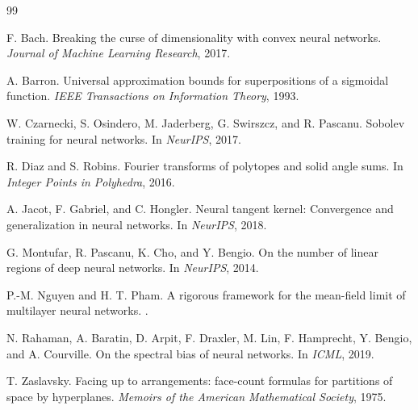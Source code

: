 \documentclass{article}
\begin{document}
\begin{thebibliography}{99}

F. Bach.
\newblock Breaking the curse of dimensionality with convex neural networks.
\newblock \emph{Journal of Machine Learning Research}, 2017.

A. Barron.
\newblock Universal approximation bounds for superpositions of a sigmoidal function.
\newblock \emph{IEEE Transactions on Information Theory}, 1993.

W. Czarnecki, S. Osindero, M. Jaderberg, G. Swirszcz, and R. Pascanu.
\newblock Sobolev training for neural networks.
\newblock In \emph{NeurIPS}, 2017.

R. Diaz and S. Robins.
\newblock Fourier transforms of polytopes and solid angle sums.
\newblock In \emph{Integer Points in Polyhedra}, 2016.

A. Jacot, F. Gabriel, and C. Hongler.
\newblock Neural tangent kernel: Convergence and generalization in neural networks.
\newblock In \emph{NeurIPS}, 2018.

G. Montufar, R. Pascanu, K. Cho, and Y. Bengio.
\newblock On the number of linear regions of deep neural networks.
\newblock In \emph{NeurIPS}, 2014.

P.-M. Nguyen and H. T. Pham.
\newblock A rigorous framework for the mean-field limit of multilayer neural networks.
.

N. Rahaman, A. Baratin, D. Arpit, F. Draxler, M. Lin, F. Hamprecht, Y. Bengio, and A. Courville.
\newblock On the spectral bias of neural networks.
\newblock In \emph{ICML}, 2019.

T. Zaslavsky.
\newblock Facing up to arrangements: face-count formulas for partitions of space by hyperplanes.
\newblock \emph{Memoirs of the American Mathematical Society}, 1975.

\end{thebibliography}

\newpage

\end{document}
